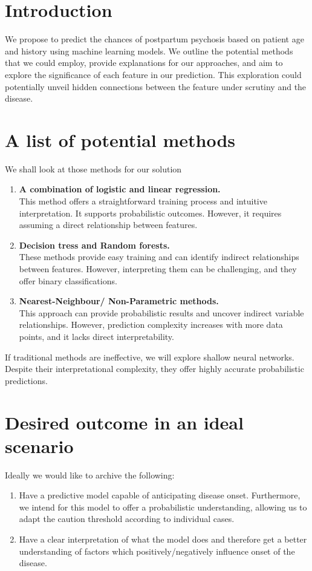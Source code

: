 \documentclass[a4paper]{article}
\begin{document}

\section{Introduction}
We propose to predict the chances of postpartum psychosis based on patient age and history using machine learning models. We outline the potential methods that we could employ, provide explanations for our approaches, and aim to explore the significance of each feature in our prediction. This exploration could potentially unveil hidden connections between the feature under scrutiny and the disease.

\section{A list of potential methods}
We shall look at those methods for our solution
\begin{enumerate}
    \item \textbf{A combination of logistic and linear regression.}\\
    This method offers a straightforward training process and intuitive interpretation. It supports probabilistic outcomes. However, it requires assuming a direct relationship between features.
    \item \textbf{Decision tress and Random forests.}\\
    These methods provide easy training and can identify indirect relationships between features. However, interpreting them can be challenging, and they offer binary classifications.
    \item \textbf{Nearest-Neighbour/ Non-Parametric methods.}\\
    This approach can provide probabilistic results and uncover indirect variable relationships. However, prediction complexity increases with more data points, and it lacks direct interpretability.
\end{enumerate}
If traditional methods are ineffective, we will explore shallow neural networks. Despite their interpretational complexity, they offer highly accurate probabilistic predictions.
\section{Desired outcome in an ideal scenario}
Ideally we would like to archive the following:

\begin{enumerate}
    \item Have a  predictive model capable of anticipating disease onset. Furthermore, we intend for this model to offer a probabilistic understanding, allowing us to adapt the caution threshold according to individual cases.
    \item Have a clear interpretation of what the model does and therefore get a better understanding of factors which positively/negatively influence onset of the disease.
\end{enumerate}

\end{document}
